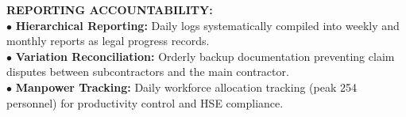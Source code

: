 \documentclass[10pt,a4paper,landscape]{article}
\begin{document}
\begin{minipage}[t]{0.30\linewidth}
  \begin{tcolorbox}[sharp corners, boxrule=0.6pt, colframe=pnavy, colback=pbglight, left=2.5mm, right=2.5mm, top=2mm, bottom=2mm, height=54mm]
    {\fontsize{7pt}{8.5pt}\selectfont\bfseries\color{pnavy}REPORTING ACCOUNTABILITY:}\\[1.5mm]
    {\fontsize{6.5pt}{8.2pt}\selectfont\color{psteel}
    $\bullet$ \textbf{Hierarchical Reporting:} Daily logs systematically compiled into weekly and monthly reports as legal progress records.\\
    $\bullet$ \textbf{Variation Reconciliation:} Orderly backup documentation preventing claim disputes between subcontractors and the main contractor.\\
    $\bullet$ \textbf{Manpower Tracking:} Daily workforce allocation tracking (peak 254 personnel) for productivity control and HSE compliance.
    }
  \end{tcolorbox}
\end{minipage}%
\hfill
\end{document}
